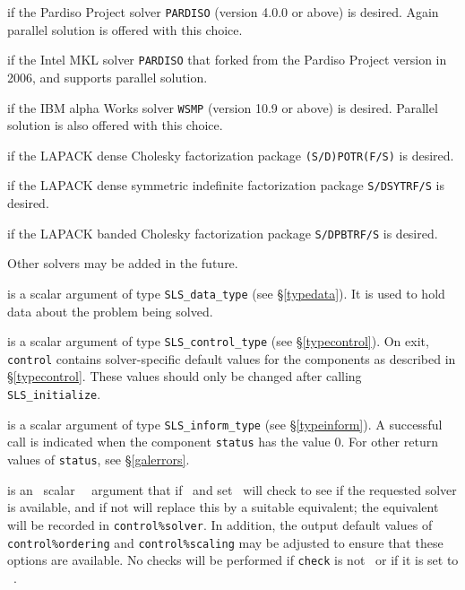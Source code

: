 \documentclass{galahad}
\newcommand{\packagename}{SLS}
\begin{document}
\begin{description}
\begin{description}
 if the Pardiso Project solver {\tt PARDISO} (version 4.0.0
or above) is desired. Again parallel solution is offered with this choice.

 if the Intel MKL solver {\tt PARDISO} that forked from the
Pardiso Project version in 2006, and supports parallel solution.

 if the IBM alpha Works solver {\tt WSMP} (version 10.9
or above) is desired. Parallel solution is also offered with this choice.

 if the LAPACK dense Cholesky factorization package
{\tt (S/D)POTR(F/S)} is desired.

 if the LAPACK dense symmetric indefinite factorization package
{\tt S/DSYTRF/S} is desired.

 if the LAPACK banded Cholesky factorization package
{\tt S/DPBTRF/S} is desired.

\end{description}
Other solvers may be added in the future.

 is a scalar \intentout argument of type
{\tt \packagename\_data\_type}
(see \S\ref{typedata}). It is used to hold data about the problem being
solved.

 is a scalar \intentout argument of type
{\tt \packagename\_control\_type}
(see \S\ref{typecontrol}).
On exit, {\tt control} contains solver-specific default values for the
components as described in \S\ref{typecontrol}.
These values should only be changed after calling
{\tt \packagename\_initialize}.

 is a scalar \intentout argument of type
{\tt \packagename\_inform\_type}
(see \S\ref{typeinform}).
A successful call is indicated when the  component {\tt status} has the value 0.
For other return values of {\tt status}, see \S\ref{galerrors}.

 is an \optional\ scalar \logical\ \intentin\ argument 
that if \present\ and set \true\ will check to see if the requested solver 
is available, and if not will replace this by a suitable equivalent; the 
equivalent will be recorded in {\tt control\%solver}. 
In addition, the output default values of
{\tt control\%ordering} and {\tt control\%scaling} may be adjusted to ensure
that these options are available.
No checks will be performed if {\tt check} is not \present\ or if it is set
to \false\ .
\end{description}
\end{document}
